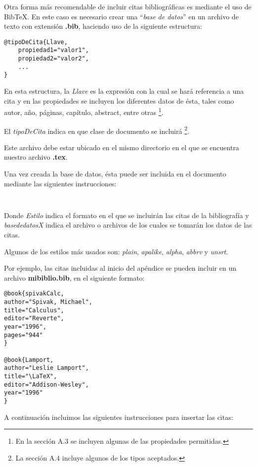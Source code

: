 \documentclass[letterpaper,12pt]{book}
\begin{document}
Otra forma más recomendable de incluir citas bibliográficas es
mediante el uso de Bib\TeX{}. En este caso es necesario crear
una ``\textit{base de datos}'' en un archivo de texto con 
extensión \textbf{.bib}, haciendo uso de la siguiente estructura:

\begin{verbatim}
@tipoDeCita{Llave,
	propiedad1="valor1",
	propiedad2="valor2",
	...
}
\end{verbatim}

En esta estructura, la \emph{Llave} es la expresión con la cual 
se hará referencia a una cita y en las propiedades se incluyen
los diferentes datos de ésta, tales como autor, año, páginas,
capítulo, abstract, entre otras \footnote{En la sección A.3
se incluyen algunas de las propiedades permitidas.}.

El \emph{tipoDeCita} indica en que clase de documento se incluirá
\footnote{La sección A.4 incluye algunos de los tipos
aceptados.}.

Este archivo debe estar ubicado en el mismo directorio en el que
se encuentra nuestro archivo \textbf{.tex}.

Una vez creada la base de datos, ésta puede ser incluida en el
documento mediante las siguientes instrucciones:

\begin{verbatim}


\end{verbatim}

Donde \emph{Estilo} indica el formato en el que se incluirán las
citas de la bibliografía y \emph{basededatosX} indica el archivo
o archivos de los cuales se tomarán los datos de las citas.

Algunos de los estilos más usados son: \emph{plain},
\emph{apalike}, \emph{alpha}, \emph{abbrv} y \emph{unsrt}.

Por ejemplo, las citas incluidas al inicio del apéndice se 
pueden incluir en un archivo \textbf{mibiblio.bib}, en el
siguiente formato:

\begin{verbatim}
@book{spivakCalc,
author="Spivak, Michael",
title="Calculus",
editor="Reverte",
year="1996",
pages="944"
}

@book{Lamport,
author="Leslie Lamport",
title="\LaTeX",
editor="Addison-Wesley",
year="1996"
}
\end{verbatim}

A continuación incluimos las siguientes instrucciones para 
insertar las citas:
\end{document}
